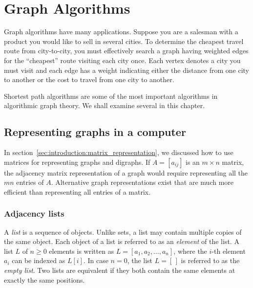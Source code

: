 
\chapter{Graph Algorithms}
\label{chap:graph_algorithms}

Graph algorithms have many applications. Suppose you are a salesman
with a product you would like to sell in several cities. To determine
the cheapest travel route from city-to-city, you must effectively
search a graph having weighted edges for the ``cheapest'' route
visiting each city once. Each vertex denotes a city you must visit and
each edge has a weight indicating either the distance from one city to
another or the cost to travel from one city to another.

Shortest path algorithms are some of the most important algorithms in
algorithmic graph theory. We shall examine several in this chapter.



\section{Representing graphs in a computer}

In section~\ref{sec:introduction:matrix_representation}, we discussed
how to use matrices for representing graphs and digraphs. If
$A = [a_{ij}]$ is an $m \times n$ matrix, the adjacency matrix
representation of a graph would require representing all the $mn$
entries of $A$. Alternative graph representations exist that are much
more efficient than representing all entries of a matrix.



\subsection{Adjacency lists}

A \emph{list} is a sequence of objects. Unlike sets, a list may
contain multiple copies of the same object. Each object of a list is
referred to as an \emph{element} of the list. A list $L$ of
$n \geq 0$ elements is written as $L = [a_1, a_2, \dots, a_n]$, where
the $i$-th element $a_i$ can be indexed as $L[i]$. In case $n = 0$,
the list $L = [\,]$ is referred to as the \emph{empty list}. Two lists
are equivalent if they both contain the same elements at exactly the
same positions.

